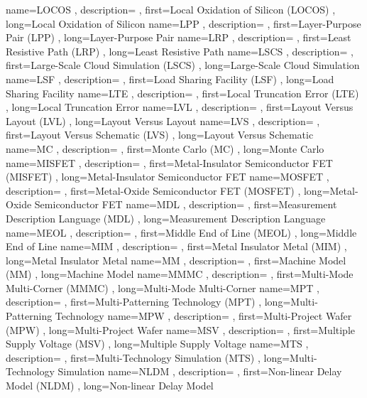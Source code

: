 { name={LOCOS}
, description={}
, first={Local Oxidation of Silicon (LOCOS)}
, long={Local Oxidation of Silicon}
}
{ name={LPP}
, description={}
, first={Layer-Purpose Pair (LPP)}
, long={Layer-Purpose Pair}
}
{ name={LRP}
, description={}
, first={Least Resistive Path (LRP)}
, long={Least Resistive Path}
}
{ name={LSCS}
, description={}
, first={Large-Scale Cloud Simulation (LSCS)}
, long={Large-Scale Cloud Simulation}
}
{ name={LSF}
, description={}
, first={Load Sharing Facility (LSF)}
, long={Load Sharing Facility}
}
{ name={LTE}
, description={}
, first={Local Truncation Error (LTE)}
, long={Local Truncation Error}
}
{ name={LVL}
, description={}
, first={Layout Versus Layout (LVL)}
, long={Layout Versus Layout}
}
{ name={LVS}
, description={}
, first={Layout Versus Schematic (LVS)}
, long={Layout Versus Schematic}
}
{ name={MC}
, description={}
, first={Monte Carlo (MC)}
, long={Monte Carlo}
}
{ name={MISFET}
, description={}
, first={Metal-Insulator Semiconductor FET (MISFET)}
, long={Metal-Insulator Semiconductor FET}
}
{ name={MOSFET}
, description={}
, first={Metal-Oxide Semiconductor FET (MOSFET)}
, long={Metal-Oxide Semiconductor FET}
}
{ name={MDL}
, description={}
, first={Measurement Description Language (MDL)}
, long={Measurement Description Language}
}
{ name={MEOL}
, description={}
, first={Middle End of Line (MEOL)}
, long={Middle End of Line}
}
{ name={MIM}
, description={}
, first={Metal Insulator Metal (MIM)}
, long={Metal Insulator Metal}
}
{ name={MM}
, description={}
, first={Machine Model (MM)}
, long={Machine Model}
}
{ name={MMMC}
, description={}
, first={Multi-Mode Multi-Corner (MMMC)}
, long={Multi-Mode Multi-Corner}
}
{ name={MPT}
, description={}
, first={Multi-Patterning Technology (MPT)}
, long={Multi-Patterning Technology}
}
{ name={MPW}
, description={}
, first={Multi-Project Wafer (MPW)}
, long={Multi-Project Wafer}
}
{ name={MSV}
, description={}
, first={Multiple Supply Voltage (MSV)}
, long={Multiple Supply Voltage}
}
{ name={MTS}
, description={}
, first={Multi-Technology Simulation (MTS)}
, long={Multi-Technology Simulation}
}
{ name={NLDM}
, description={}
, first={Non-linear Delay Model (NLDM)}
, long={Non-linear Delay Model}
}
